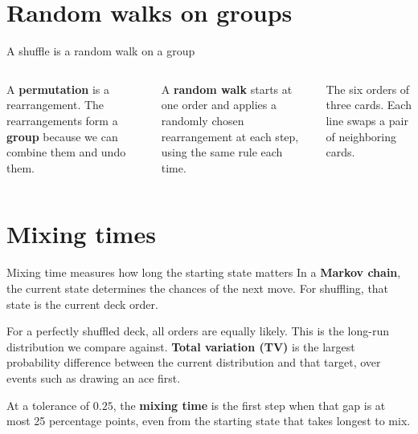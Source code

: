 \documentclass[aspectratio=169,10pt]{beamer}
\begin{document}
\section{Random walks on groups}
\begin{frame}{A shuffle is a random walk on a group}
\begin{columns}[c]
\large
A \textbf{permutation} is a rearrangement. The rearrangements form a \textbf{group} because we can combine them and undo them.
\par\medskip
A \textbf{random walk} starts at one order and applies a randomly chosen rearrangement at each step, using the same rule each time.
\centering
{}
\par\small The six orders of three cards. Each line swaps a pair of neighboring cards.
\end{columns}
\end{frame}

\section{Mixing times}
\begin{frame}{Mixing time measures how long the starting state matters}
\large
In a \textbf{Markov chain}, the current state determines the chances of the next move. For shuffling, that state is the current deck order.
\par\medskip
For a perfectly shuffled deck, all orders are equally likely. This is the long-run distribution we compare against.
\textbf{Total variation (TV)} is the largest probability difference between the current distribution and that target, over events such as drawing an ace first.
\par\medskip
At a tolerance of $0.25$, the \textbf{mixing time} is the first step when that gap is at most 25 percentage points, even from the starting state that takes longest to mix.
\end{frame}
\end{document}
